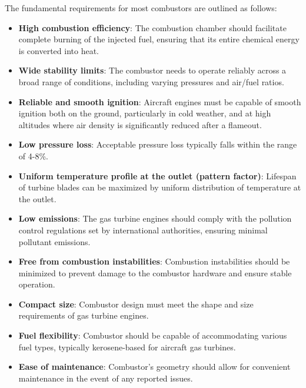 The fundamental requirements for most combustors \cite{LAH2010} are outlined as follows:
\begin{itemize}
    \item \textbf{High combustion efficiency}: The combustion chamber should facilitate complete burning of the injected fuel, ensuring that its entire chemical energy is converted into heat.

    \item \textbf{Wide stability limits}: The combustor needs to operate reliably across a broad range of conditions, including varying pressures and air/fuel ratios.

    \item \textbf{Reliable and smooth ignition}: Aircraft engines must be capable of smooth ignition both on the ground, particularly in cold weather, and at high altitudes where air density is significantly reduced after a flameout.

    \item \textbf{Low pressure loss}: Acceptable pressure loss typically falls within the range of 4-8\%.

    \item \textbf{Uniform temperature profile at the outlet (pattern factor)}: Lifespan of turbine blades can be maximized by uniform distribution of temperature at the outlet.

    \item \textbf{Low emissions}: The gas turbine engines should comply with the pollution control regulations set by international authorities, ensuring minimal pollutant emissions.

    \item \textbf{Free from combustion instabilities}: Combustion instabilities should be minimized to prevent damage to the combustor hardware and ensure stable operation.

    \item \textbf{Compact size}: Combustor design must meet the shape and size requirements of gas turbine engines.

    \item \textbf{Fuel flexibility}: Combustor should be capable of accommodating various fuel types, typically kerosene-based for aircraft gas turbines.

    \item \textbf{Ease of maintenance}: Combustor's geometry should allow for convenient maintenance in the event of any reported issues.
\end{itemize}

